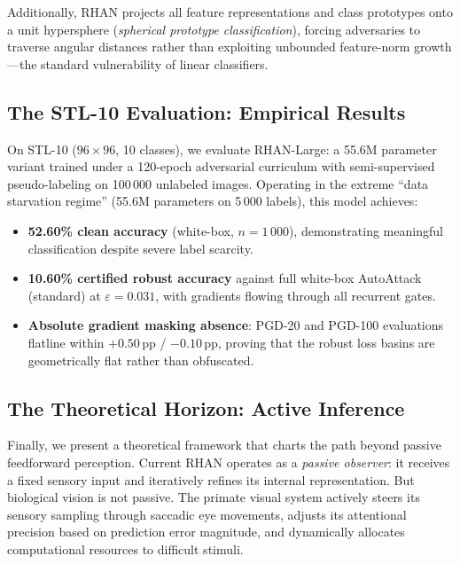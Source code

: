 \documentclass[12pt,a4paper]{article}
\begin{document}
Additionally, RHAN projects all feature representations and class prototypes
onto a unit hypersphere (\textit{spherical prototype classification}), forcing
adversaries to traverse angular distances rather than exploiting unbounded
feature-norm growth---the standard vulnerability of linear classifiers.

\subsection{The STL-10 Evaluation: Empirical Results}

On STL-10 ($96{\times}96$, 10 classes), we evaluate RHAN-Large: a 55.6M
parameter variant trained under a 120-epoch adversarial curriculum with
semi-supervised pseudo-labeling on 100\,000 unlabeled images. Operating
in the extreme ``data starvation regime'' (55.6M parameters on 5\,000 labels),
this model achieves:

\begin{itemize}[leftmargin=1.5em]
  \item \textbf{52.60\% clean accuracy} (white-box, $n{=}1\,000$), demonstrating
        meaningful classification despite severe label scarcity.
  \item \textbf{10.60\% certified robust accuracy} against full white-box
        AutoAttack (standard) at $\varepsilon{=}0.031$, with gradients flowing
        through all recurrent gates.
  \item \textbf{Absolute gradient masking absence}: PGD-20 and PGD-100 evaluations
        flatline within $+0.50$\,pp / $-0.10$\,pp, proving that the robust loss
        basins are geometrically flat rather than obfuscated.
\end{itemize}

\subsection{The Theoretical Horizon: Active Inference}

Finally, we present a theoretical framework that charts the path beyond passive
feedforward perception. Current RHAN operates as a \textit{passive observer}:
it receives a fixed sensory input and iteratively refines its internal
representation. But biological vision is not passive. The primate visual
system actively steers its sensory sampling through saccadic eye movements,
adjusts its attentional precision based on prediction error magnitude, and
dynamically allocates computational resources to difficult stimuli.
\end{document}
